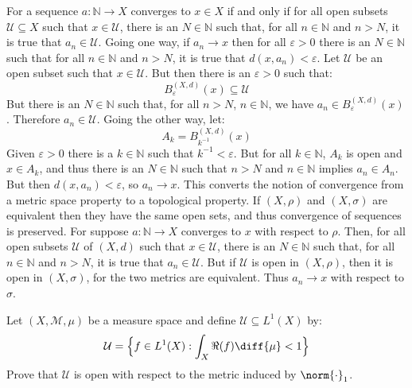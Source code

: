 \documentclass[crop=false,class=article,oneside]{standalone}
\begin{document}
    \begin{solution}
        For a sequence $a:\mathbb{N}\rightarrow{X}$ converges to
        $x\in{X}$ if and only if for all open subsets
        $\mathcal{U}\subseteq{X}$ such that $x\in\mathcal{U}$, there is
        an $N\in\mathbb{N}$ such that, for all $n\in\mathbb{N}$ and
        $n>N$, it is true that $a_{n}\in\mathcal{U}$. Going one way,
        if $a_{n}\rightarrow{x}$ then for all $\varepsilon>0$ there is
        an $N\in\mathbb{N}$ such that for all $n\in\mathbb{N}$ and
        $n>N$, it is true that $d(x,a_{n})<\varepsilon$. Let
        $\mathcal{U}$ be an open subset such that $x\in\mathcal{U}$.
        But then there is an $\varepsilon>0$ such that:
        \begin{equation}
            B_{\varepsilon}^{(X,d)}(x)\subseteq\mathcal{U}
        \end{equation}
        But there is an $N\in\mathbb{N}$ such that, for all $n>N$,
        $n\in\mathbb{N}$, we have $a_{n}\in{B}_{\varepsilon}^{(X,d)}(x)$.
        Therefore $a_{n}\in\mathcal{U}$. Going the other way, let:
        \begin{equation}
            A_{k}=B_{k^{\minus{1}}}^{(X,d)}(x)
        \end{equation}
        Given $\varepsilon>0$ there is a $k\in\mathbb{N}$ such that
        $k^{\minus{1}}<\varepsilon$. But for all $k\in\mathbb{N}$,
        $A_{k}$ is open and $x\in{A}_{k}$, and thus there is an
        $N\in\mathbb{N}$ such that $n>N$ and $n\in\mathbb{N}$ implies
        $a_{n}\in{A}_{n}$. But then $d(x,a_{n})<\varepsilon$, so
        $a_{n}\rightarrow{x}$. This converts the notion of convergence from
        a metric space property to a topological property. If
        $(X,\rho)$ and $(X,\sigma)$ are equivalent then they have the
        same open sets, and thus convergence of sequences is preserved.
        For suppose $a:\mathbb{N}\rightarrow{X}$ converges to $x$ with
        respect to $\rho$. Then, for all open subsets $\mathcal{U}$ of
        $(X,d)$ such that $x\in\mathcal{U}$, there is an $N\in\mathbb{N}$
        such that, for all $n\in\mathbb{N}$ and $n>N$, it is true that
        $a_{n}\in\mathcal{U}$. But if $\mathcal{U}$ is open in
        $(X,\rho)$, then it is open in $(X,\sigma)$, for the two metrics
        are equivalent. Thus $a_{n}\rightarrow{x}$ with respect to
        $\sigma$.
    \end{solution}
    \begin{problem}
        Let $(X,\mathcal{M},\mu)$ be a measure space and define
        $\mathcal{U}\subseteq{L}^{1}(X)$ by:
        \begin{equation}
            \mathcal{U}=
                \Big\{f\in{L}^{1}(X):\int_{X}\Re(f)\diff{\mu}<1\Big\}
        \end{equation}
        Prove that $\mathcal{U}$ is open with respect to the
        metric induced by $\norm{\cdot}_{1}$.
    \end{problem}
\end{document}

